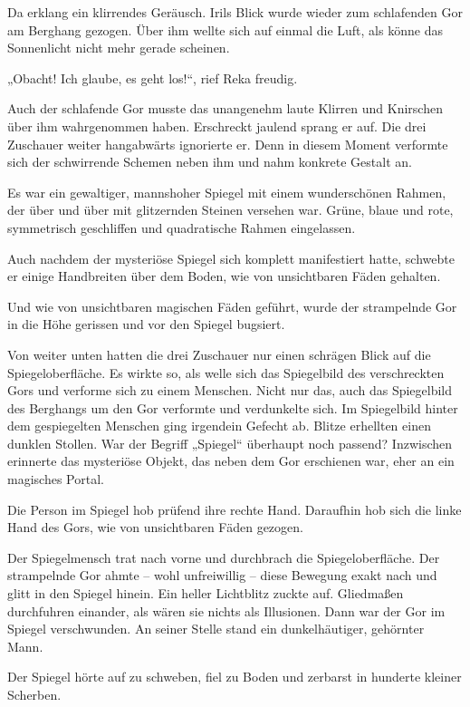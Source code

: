 Da erklang ein klirrendes Geräusch. Irils Blick wurde wieder zum schlafenden Gor am Berghang gezogen. Über ihm wellte sich auf einmal die Luft, als könne das Sonnenlicht nicht mehr gerade scheinen.

„Obacht! Ich glaube, es geht los!“, rief Reka freudig.

Auch der schlafende Gor musste das unangenehm laute Klirren und Knirschen über ihm wahrgenommen haben. Erschreckt jaulend sprang er auf. Die drei Zuschauer weiter hangabwärts ignorierte er. Denn in diesem Moment verformte sich der schwirrende Schemen neben ihm und nahm konkrete Gestalt an.

Es war ein gewaltiger, mannshoher Spiegel mit einem wunderschönen Rahmen, der über und über mit glitzernden Steinen versehen war. Grüne, blaue und rote, symmetrisch geschliffen und quadratische Rahmen eingelassen.

Auch nachdem der mysteriöse Spiegel sich komplett manifestiert hatte, schwebte er einige Handbreiten über dem Boden, wie von unsichtbaren Fäden gehalten.

Und wie von unsichtbaren magischen Fäden geführt, wurde der strampelnde Gor in die Höhe gerissen und vor den Spiegel bugsiert.

Von weiter unten hatten die drei Zuschauer nur einen schrägen Blick auf die Spiegeloberfläche. Es wirkte so, als welle sich das Spiegelbild des verschreckten Gors und verforme sich zu einem Menschen. Nicht nur das, auch das Spiegelbild des Berghangs um den Gor verformte und verdunkelte sich. Im Spiegelbild hinter dem gespiegelten Menschen ging irgendein Gefecht ab. Blitze erhellten einen dunklen Stollen. War der Begriff „Spiegel“ überhaupt noch passend? Inzwischen erinnerte das mysteriöse Objekt, das neben dem Gor erschienen war, eher an ein magisches Portal.

Die Person im Spiegel hob prüfend ihre rechte Hand. Daraufhin hob sich die linke Hand des Gors, wie von unsichtbaren Fäden gezogen.

Der Spiegelmensch trat nach vorne und durchbrach die Spiegeloberfläche. Der strampelnde Gor ahmte – wohl unfreiwillig – diese Bewegung exakt nach und glitt in den Spiegel hinein. Ein heller Lichtblitz zuckte auf. Gliedmaßen durchfuhren einander, als wären sie nichts als Illusionen. Dann war der Gor im Spiegel verschwunden. An seiner Stelle stand ein dunkelhäutiger, gehörnter Mann.

Der Spiegel hörte auf zu schweben, fiel zu Boden und zerbarst in hunderte kleiner Scherben.

